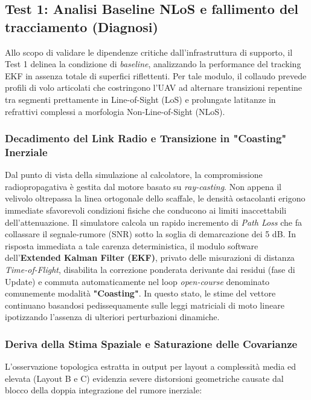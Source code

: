 \documentclass[twoside]{article}
\begin{document}
\newpage
\subsection{Test 1: Analisi Baseline NLoS e fallimento del tracciamento (Diagnosi)}

Allo scopo di validare le dipendenze critiche dall'infrastruttura di supporto, il Test 1 delinea la condizione di \textit{baseline}, analizzando la performance del tracking EKF in assenza totale di superfici riflettenti. Per tale modulo, il collaudo prevede profili di volo articolati che costringono l'UAV ad alternare transizioni repentine tra segmenti prettamente in Line-of-Sight (LoS) e prolungate latitanze in refrattivi complessi a morfologia Non-Line-of-Sight (NLoS).

\subsubsection{Decadimento del Link Radio e Transizione in "Coasting" Inerziale}
Dal punto di vista della simulazione al calcolatore, la compromissione radiopropagativa è gestita dal motore basato su \textit{ray-casting}. Non appena il velivolo oltrepassa la linea ortogonale dello scaffale, le densità ostacolanti erigono immediate sfavorevoli condizioni fisiche che conducono ai limiti inaccettabili dell'attenuazione. Il simulatore calcola un rapido incremento di \textit{Path Loss} che fa collassare il segnale-rumore (SNR) sotto la soglia di demarcazione dei 5 dB.
In risposta immediata a tale carenza deterministica, il modulo software dell'\textbf{Extended Kalman Filter (EKF)}, privato delle misurazioni di distanza \textit{Time-of-Flight}, disabilita la correzione ponderata derivante dai residui (fase di Update) e commuta automaticamente nel loop \textit{open-course} denominato comunemente modalità \textbf{"Coasting"}. In questo stato, le stime del vettore continuano basandosi pedissequamente sulle leggi matriciali di moto lineare ipotizzando l'assenza di ulteriori perturbazioni dinamiche.

\subsubsection{Deriva della Stima Spaziale e Saturazione delle Covarianze}
L'osservazione topologica estratta in output per layout a complessità media ed elevata (Layout B e C) evidenzia severe distorsioni geometriche causate dal blocco della doppia integrazione del rumore inerziale:
\end{document}
